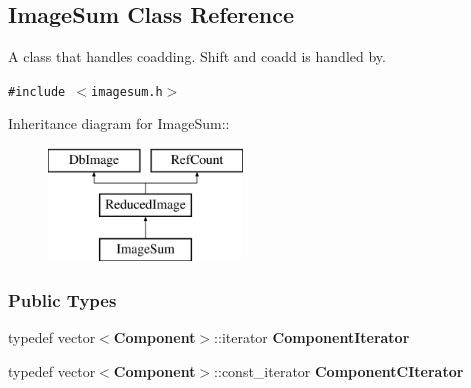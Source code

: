 \subsection{Image\-Sum  Class Reference}
\label{class_imagesum}
A class that handles coadding. Shift and coadd is handled by. 


{\tt \#include $<$imagesum.h$>$}

Inheritance diagram for Image\-Sum::\begin{figure}[H]
\begin{center}
\leavevmode
\includegraphics[height=3cm]{class_imagesum}
\end{center}
\end{figure}
\subsubsection*{Public Types}
\begin{CompactItemize}
\item 
{}
typedef vector$<${\bf Component}$>$::iterator {\bf Component\-Iterator}\label{class_imagesum_s0}

\item 
{}
typedef vector$<${\bf Component}$>$::const\_\-iterator {\bf Component\-CIterator}\label{class_imagesum_s1}

\end{CompactItemize}
